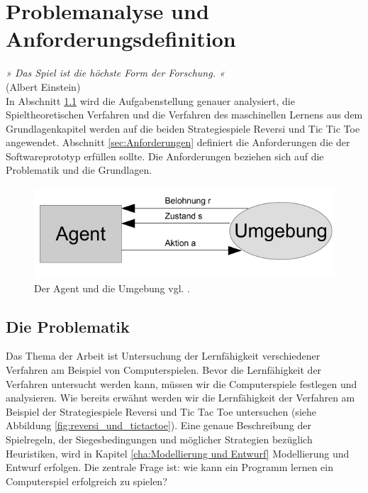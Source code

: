 \chapter{Problemanalyse und Anforderungsdefinition}
\label{cha:pua}

\emph{» Das Spiel ist die höchste Form der Forschung. «} \\
(Albert Einstein) \\

In Abschnitt \ref{sec:Die Problematik} wird die Aufgabenstellung genauer analysiert, die Spieltheoretischen Verfahren und die Verfahren des maschinellen Lernens aus dem Grundlagenkapitel werden auf die beiden Strategiespiele Reversi und Tic Tic Toe angewendet. Abschnitt \ref{sec:Anforderungen} definiert die Anforderungen die der Softwareprototyp erfüllen sollte. Die Anforderungen beziehen sich auf die Problematik und die Grundlagen. 

\begin{figure}[!htbp]
  \centering
  \includegraphics[scale = 1.4]{inhalt/abbildungen/agent_umgebung.pdf}
  \caption{Der Agent und die Umgebung vgl. \cite[290]{Ertel}.}
  \label{fig:agent_umgebung}
\end{figure} 

\section{Die Problematik}
\label{sec:Die Problematik}
Das Thema der Arbeit ist Untersuchung der Lernfähigkeit verschiedener Verfahren am Beispiel von Computerspielen. Bevor die Lernfähigkeit der Verfahren untersucht werden kann, müssen wir die Computerspiele festlegen und analysieren. Wie bereits erwähnt werden wir die Lernfähigkeit der Verfahren am Beispiel der Strategiespiele Reversi und Tic Tac Toe untersuchen (siehe Abbildung \ref{fig:reversi_und_tictactoe}). Eine genaue Beschreibung der Spielregeln, der Siegesbedingungen und möglicher Strategien bezüglich Heuristiken, wird in Kapitel \ref{cha:Modellierung und Entwurf} Modellierung und Entwurf erfolgen. Die zentrale Frage ist: wie kann ein Programm lernen ein Computerspiel erfolgreich zu spielen? \\

